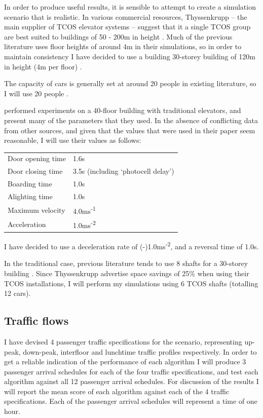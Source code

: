 \documentclass{UoYCSproject}
\begin{document}
In order to produce useful results, it is sensible to attempt to create a simulation scenario that is realistic.  In various commercial resources, Thyssenkrupp -- the main supplier of TCOS elevator systems -- suggest that it a single TCOS group are best suited to buildings of 50 - 200m in height \citep{ThyssenkruppFactSheet, ThyssenkruppWebsite}.  Much of the previous literature uses floor heights of around 4m in their simulations, so in order to maintain consistency I have decided to use a building 30-storey building of 120m in height (4m per floor) \citep{Brand2004, Nikovski2003, Rong2003}.

The capacity of cars is generally set at around 20 people in existing literature, so I will use 20 people \citep{Rong2003, Crites1996, Siikonen1993}.

\citet{Rong2003} performed experiments on a 40-floor building with traditional elevators, and present many of the parameters that they used.  In the absence of conflicting data from other sources, and given that the values that were used in their paper seem reasonable, I will use their values as follows:

\begin{tabular}{l l}
	Door opening time			& 1.6s \\
	Door closing time			& 3.5s (including `photocell delay') \\
	Boarding time				& 1.0s \\
	Alighting time				& 1.0s \\
	Maximum velocity			& 4.0ms\textsuperscript{-1} \\
	Acceleration				& 1.0ms\textsuperscript{-2}
\end{tabular}

I have decided to use a deceleration rate of (-)1.0ms\textsuperscript{-2}, and a reversal time of 1.0s.

In the traditional case, previous literature tends to use 8 shafts for a 30-storey building \citep{Siikonen1993, Nikovski2003, Brand2004}.  Since Thyssenkrupp advertise space savings of 25\% when using their TCOS installations, I will perform my simulations using 6 TCOS shafts (totalling 12 cars).

\subsection{Traffic flows}

I have devised 4 passenger traffic specifications for the scenario, representing up-peak, down-peak, interfloor and lunchtime traffic profiles respectively.  In order to get a reliable indication of the performance of each algorithm I will produce 3 passenger arrival schedules for each of the four traffic specifications, and test each algorithm against all 12 passenger arrival schedules.  For discussion of the results I will report the mean score of each algorithm against each of the 4 traffic specifications.  Each of the passenger arrival schedules will represent a time of one hour.
\end{document}
